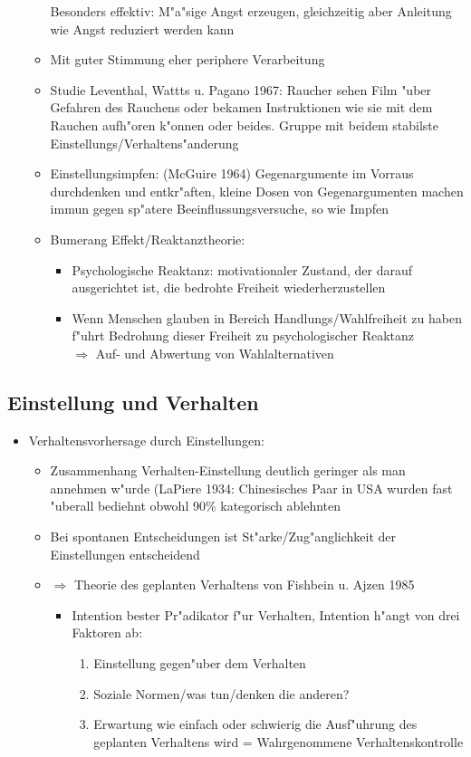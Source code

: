 \begin{itemize}
\begin{itemize}
				Besonders effektiv: M"a"sige Angst erzeugen, gleichzeitig aber Anleitung wie Angst reduziert werden kann
			\item
				Mit guter Stimmung eher periphere Verarbeitung
			\item
				Studie Leventhal, Wattts u. Pagano 1967: Raucher sehen Film "uber Gefahren des Rauchens oder bekamen Instruktionen wie sie mit dem Rauchen aufh"oren k"onnen oder beides. Gruppe mit beidem stabilste Einstellungs/Verhaltens"anderung
			\item
				Einstellungsimpfen: (McGuire 1964) Gegenargumente im Vorraus durchdenken und entkr"aften, kleine Dosen von Gegenargumenten machen immun gegen sp"atere Beeinflussungsversuche, so wie Impfen
			\item
				Bumerang Effekt/Reaktanztheorie:
				\begin{itemize}
					\item
						Psychologische Reaktanz: motivationaler Zustand, der darauf ausgerichtet ist, die bedrohte Freiheit wiederherzustellen
					\item
						Wenn Menschen glauben in Bereich Handlungs/Wahlfreiheit zu haben f"uhrt Bedrohung dieser Freiheit zu psychologischer Reaktanz\\
						$\Rightarrow$ Auf- und Abwertung von Wahlalternativen
				\end{itemize}
		\end{itemize}
\end{itemize}
\subsection{Einstellung und Verhalten}
\begin{itemize}
	\item
		Verhaltensvorhersage durch Einstellungen:
		\begin{itemize}
			\item
				Zusammenhang Verhalten-Einstellung deutlich geringer als man annehmen w"urde (LaPiere 1934: Chinesisches Paar in USA wurden fast "uberall bediehnt obwohl 90\% kategorisch ablehnten
			\item
				Bei spontanen Entscheidungen ist St"arke/Zug"anglichkeit der Einstellungen entscheidend
			\item
				$\Rightarrow$ Theorie des geplanten Verhaltens von Fishbein u. Ajzen 1985
				\begin{itemize}
					\item
						Intention bester Pr"adikator f"ur Verhalten, Intention h"angt von drei Faktoren ab:
						\begin{enumerate}
							\item
								Einstellung gegen"uber dem Verhalten
							\item
								Soziale Normen/was tun/denken die anderen?
							\item
								Erwartung wie einfach oder schwierig die Ausf"uhrung des geplanten Verhaltens wird = Wahrgenommene Verhaltenskontrolle
					\end{enumerate}
				\end{itemize}
		\end{itemize}
\end{itemize}
